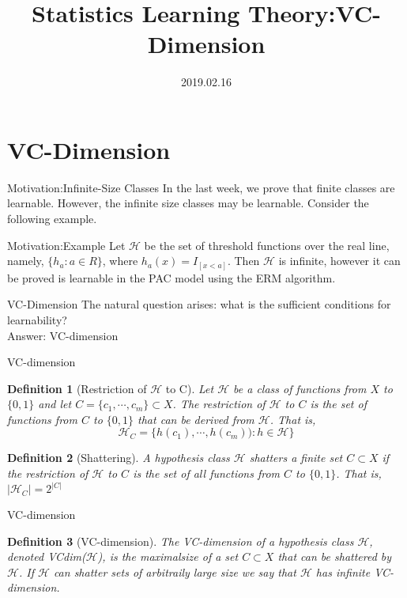 \documentclass{beamer}
\title[Introduction]{Statistics Learning Theory:VC-Dimension}
\author{}
\institute{}
\date{2019.02.16}
\newtheorem*{dfn}{Definition}
\begin{document}
\begin{frame}
  \titlepage
\end{frame}


\section{VC-Dimension}
\begin{frame}{Motivation:Infinite-Size Classes}
	In the last week, we prove that finite classes are learnable. However, the infinite size classes may be learnable. Consider the following example.
\end{frame}
\begin{frame}{Motivation:Example}
	Let $\mathcal{H}$ be the set of threshold functions over the real line, namely, $\{h_a:a \in R\}$, where $h_a(x) = I_{[x<a]}$. Then $\mathcal{H}$ is infinite, however it can be proved is learnable in the PAC model using the ERM algorithm.
\end{frame}
\begin{frame}{VC-Dimension}
	The natural question arises: what is the sufficient conditions for learnability? \\
	Answer: VC-dimension
\end{frame}
\begin{frame}{VC-dimension}
	\begin{dfn}[Restriction of $\mathcal{H}$ to C]
		Let $\mathcal{H}$ be a class of functions from $X$ to $\{0,1\}$ and let $C = \{c_1,\cdots,c_m\} \subset X$. The restriction of $\mathcal{H}$ to $C$ is the set of functions from $C$ to $\{0,1\}$ that can be derived from $\mathcal{H}$. That is, 
	\[\mathcal{H}_C = \{h(c_1), \cdots, h(c_m)): h \in \mathcal{H}\}\]
	\end{dfn}
	\begin{dfn}[Shattering]
	A hypothesis class $\mathcal{H}$ shatters a finite set $C \subset X$ if the restriction of $\mathcal{H}$ to $C$ is the set of all functions from $C$ to $\{0,1\}$. That is, $|\mathcal{H}_C| = 2^{|C|}$
	\end{dfn}
\end{frame}
\begin{frame}{VC-dimension}
	\begin{dfn}[VC-dimension]
		The VC-dimension of a hypothesis class $\mathcal{H}$, denoted VCdim($\mathcal{H}$), is the maximalsize of a set $C \subset X$ that can be shattered by $\mathcal{H}$. If $\mathcal{H}$ can shatter sets of arbitraily large size we say that $\mathcal{H}$ has infinite VC-dimension.
	\end{dfn}
\end{frame}
\end{document}
